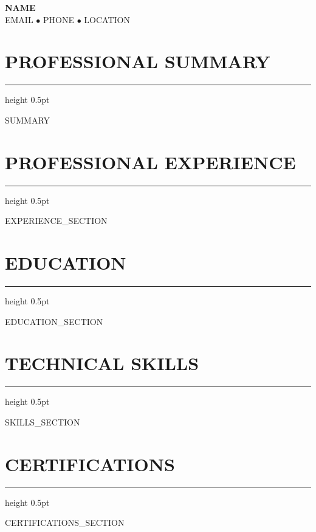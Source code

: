 \documentclass[11pt,letterpaper]{article}
\newcommand{\resumesection}[1]{
    \section*{\textcolor{primarycolor}{\MakeUppercase{#1}}}
    \vspace{-0.3em}
    \hrule height 0.5pt
    \vspace{0.5em}
}
\begin{document}
\begin{center}
    {\Huge\textbf{{{NAME}}}} \\
    \vspace{0.3em}
    {{EMAIL}} $\bullet$ {{PHONE}} $\bullet$ {{LOCATION}} \\
\end{center}

\vspace{0.5em}

\resumesection{Professional Summary}
{{SUMMARY}}

\vspace{0.5em}

\resumesection{Professional Experience}
{{EXPERIENCE_SECTION}}

\resumesection{Education}
{{EDUCATION_SECTION}}

\resumesection{Technical Skills}
{{SKILLS_SECTION}}

\resumesection{Certifications}
{{CERTIFICATIONS_SECTION}}
\end{document}
